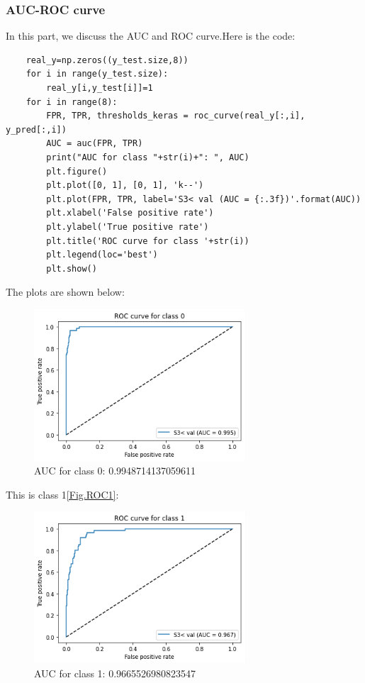 \documentclass[conference]{IEEEtran}
\begin{document}
\subsubsection{AUC-ROC curve}
In this part, we discuss the AUC and ROC curve.Here is the code:
\begin{lstlisting}
    real_y=np.zeros((y_test.size,8))
    for i in range(y_test.size):
        real_y[i,y_test[i]]=1
    for i in range(8):
        FPR, TPR, thresholds_keras = roc_curve(real_y[:,i], y_pred[:,i]) 
        AUC = auc(FPR, TPR)  
        print("AUC for class "+str(i)+": ", AUC)
        plt.figure()
        plt.plot([0, 1], [0, 1], 'k--')
        plt.plot(FPR, TPR, label='S3< val (AUC = {:.3f})'.format(AUC))
        plt.xlabel('False positive rate')
        plt.ylabel('True positive rate')
        plt.title('ROC curve for class '+str(i))
        plt.legend(loc='best')
        plt.show()    
\end{lstlisting}
The plots are shown below:
\begin{figure}[H] 
    \centering %
    \includegraphics[width=0.7\textwidth]{3ROC0.png} %
    \caption{AUC for class 0:  0.9948714137059611} %
    \label{Fig.3ROC0} %
\end{figure}
This is class 1\ref{Fig.ROC1}:
\begin{figure}[H] 
    \centering %
    \includegraphics[width=0.7\textwidth]{3ROC1.png} %
    \caption{AUC for class 1:  0.9665526980823547} %
    \label{Fig.3ROC1} %
\end{figure}
\end{document}
